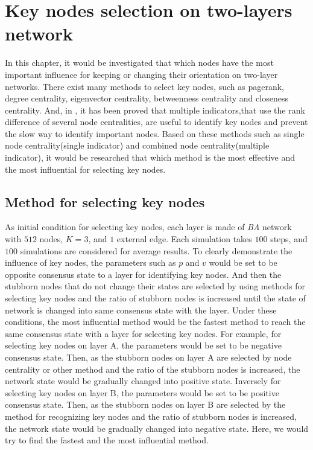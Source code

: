 
\chapter{Key nodes selection on two-layers network}
\label{chap5}
In this chapter, it would be investigated that which nodes have the most important influence for keeping or changing their orientation on two-layer networks. There exist many methods to select key nodes, such as pagerank, degree centrality, eigenvector centrality, betweenness centrality and closeness centrality. And, in \parencite{mesgari2015, huang2014}, it has been proved that multiple indicators,that use the rank difference of several node centralities, are useful to identify key nodes and prevent the slow way to identify important nodes. Based on these methods such as single node centrality(single indicator) and combined node centrality(multiple indicator), it would be researched that which method is the most effective and the most influential for selecting key nodes.  

\section{Method for selecting key nodes}
\label{sec:method for finding key nodes}
As initial condition for selecting key nodes, each layer is made of \textit{BA} network with $512$ nodes, $K=3$, and $1$ external edge. Each simulation takes $100$ steps, and $100$ simulations are considered for average results. To clearly demonstrate the influence of key nodes, the parameters such as $p$ and $v$ would be set to be opposite consensus state to a layer for identifying key nodes. And then the stubborn nodes that do not change their states are selected by using methods for selecting key nodes and the ratio of stubborn nodes is increased until the state of network is changed into same consensus state with the layer. Under these conditions, the most influential method would be the fastest method to reach the same consensus state with a layer for selecting key nodes. For example, for selecting key nodes on layer A, the parameters would be set to be negative consensus state. Then, as the stubborn nodes on layer A are selected by node centrality or other method and the ratio of the stubborn nodes is increased, the network state would be gradually changed into positive state. Inversely for selecting key nodes on layer B, the parameters would be set to be positive consensus state. Then, as the stubborn nodes on layer B are selected by the method for recognizing key nodes and the ratio of stubborn nodes is increased, the network state would be gradually changed into negative state. Here, we would try to find the fastest and the most influential method.


